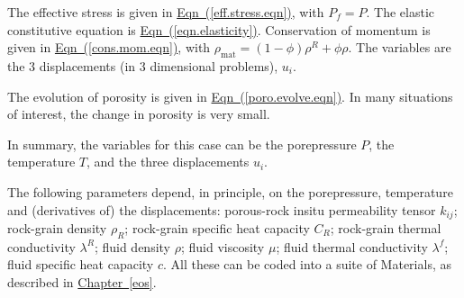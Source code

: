 \documentclass[12pt]{report}
\begin{document}
The effective stress is given in
\hyperref[eff.stress.eqn]{Eqn~(\ref*{eff.stress.eqn})}, with
$P_{f}=P$.  The elastic constitutive equation is
\hyperref[eqn.elasticity]{Eqn~(\ref*{eqn.elasticity})}.  Conservation
of momentum is given in
\hyperref[cons.mom.eqn]{Eqn~(\ref*{cons.mom.eqn})}, with
$\rho_{\mathrm{mat}} = (1 - \phi)\rho^{R} + \phi \rho$.  The variables
are the 3 displacements (in 3 dimensional problems), $u_{i}$.

The evolution of porosity is given in
\hyperref[poro.evolve.eqn]{Eqn~(\ref*{poro.evolve.eqn})}.  In many
situations of interest, the change in porosity is very small.

In summary, the variables for this case can be the porepressure $P$,
the temperature $T$, and the three displacements $u_{i}$.

The following parameters depend, in principle, on the porepressure,
temperature and (derivatives of) the displacements: porous-rock insitu
permeability tensor $k_{ij}$; rock-grain density $\rho_{R}$;
rock-grain specific heat capacity $C_{R}$; rock-grain thermal
conductivity $\lambda^{R}$; fluid density $\rho$; fluid viscosity
$\mu$; fluid thermal conductivity $\lambda^{f}$; fluid specific heat
capacity $c$.  All these can be coded into a suite of Materials, as
described in \hyperref[eos]{Chapter~\ref*{eos}}.





\end{document}
